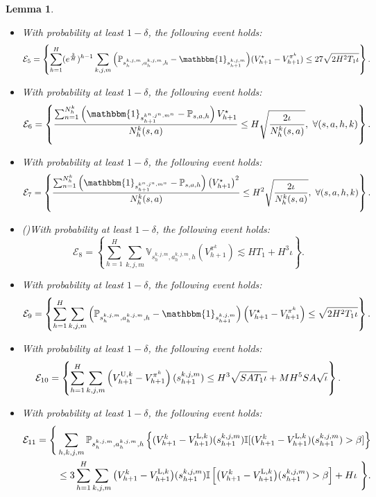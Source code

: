 \documentclass{article}
\newtheorem{lemma}{Lemma}[section]
\newcommand{\U}{\textnormal{U}}
\newcommand{\LL}{\textnormal{L}}
\begin{document}
\begin{lemma}
\begin{itemize}
        \item[(e)]  With probability at least $1-\delta$, the following event holds:
        $$\mathcal{E}_5 = \left\{\sum_{h=1}^H (e^{\frac{3}{H}})^{h-1}\sum_{k,j,m}\Big(\mathbb{P}_{s_h^{k,j,m}, a_h^{k,j,m},h}-\mathbbm{1}_{s_{h+1}^{k,j,m}}\Big)(V_{h+1}^{\star} - V_{h+1}^{\pi^k}) \leq 27\sqrt{2H^2T_1\iota}\right\}.$$
         \item[(f)]  With probability at least $1-\delta$, the following event holds:
        $$\mathcal{E}_6 = \left\{ \frac{\sum_{n=1}^{N_h^k}\left(\mathbbm{1}_{s_{h+1}^{k^n,j^n,m^n}}-\mathbb{P}_{s,a,h}\right)V_{h+1}^{\star}}{N_h^k(s,a)} \leq H\sqrt{\frac{2\iota}{N_h^k(s,a)}}, \ \forall (s,a,h,k)\right\}.$$
         \item[(g)]  With probability at least $1-\delta$, the following event holds:
        $$\mathcal{E}_7 = \left\{ \frac{\sum_{n=1}^{N_h^k}\left(\mathbbm{1}_{s_{h+1}^{k^n,j^n,m^n}}-\mathbb{P}_{s,a,h}\right)\left(V_{h+1}^{\star}\right)^2}{N_h^k(s,a)} \leq H^2\sqrt{\frac{2\iota}{N_h^k(s,a)}},\ \forall (s,a,h,k)\right\}.$$
        \item[(h)]  \textnormal{(\cite[Lemma E.6]{zheng2023federated})}With probability at least $1-\delta$, the following event holds:
        $$\mathcal{E}_8 = \left\{\sum_{h=1}^H\sum_{k,j,m}\mathbb{V}_{s_h^{k,j,m}, a_h^{k,j,m}, h} (V_{h+1}^{\pi^k}) \lesssim HT_1 +H^3\iota\right\}.$$
        \item[(i)]  With probability at least $1-\delta$, the following event holds:
        $$\mathcal{E}_9 = \left\{\sum_{h=1}^H\sum_{k,j,m}\left(\mathbb{P}_{s_h^{k,j,m}, a_h^{k,j,m},h}-\mathbbm{1}_{s_{h+1}^{k,j,m}}\right)\left(V_{h+1}^{\star} - V_{h+1}^{\pi^k}\right) \leq \sqrt{2H^2T_1\iota}\right\}.$$
        \item[(j)]  With probability at least $1-\delta$, the following event holds:
        $$\mathcal{E}_{10}= \left\{\sum_{h=1}^H\sum_{k,j,m}\left(V_{h+1}^{\U,k} - V_{h+1}^{\pi^k}\right)(s_{h+1}^{k,j,m}) \leq H^3\sqrt{SAT_1\iota} + MH^5SA\sqrt{\iota}\right\}.$$
        \item[(k)] With probability at least $1-\delta$, the following event holds:
    \begin{align*}
        \mathcal{E}_{11} = \Bigg\{&\sum_{h,k,j,m} \mathbb{P}_{s_h^{k,j,m},a_h^{k,j,m},h}\left\{(V_{h+1}^{k}-V_{h+1}^{\LL, k})(s_{h+1}^{k,j,m})  \mathbb{I}[(V_{h+1}^k- V_{h+1}^{\LL,k})(s_{h+1}^{k,j,m}) > \beta]\right\}  \\
        &\leq 3\sum_{h=1}^H\sum_{k,j,m} \big(V_{h+1}^{k}-V_{h+1}^{\LL, k}\big)(s_{h+1}^{k,j,m})  \mathbb{I}\left[\big(V_{h+1}^k- V_{h+1}^{\LL,k}\big)(s_{h+1}^{k,j,m}) > \beta\right] +H\iota\ \Bigg\}.

\end{align*}
\end{itemize}
\end{lemma}
\end{document}
